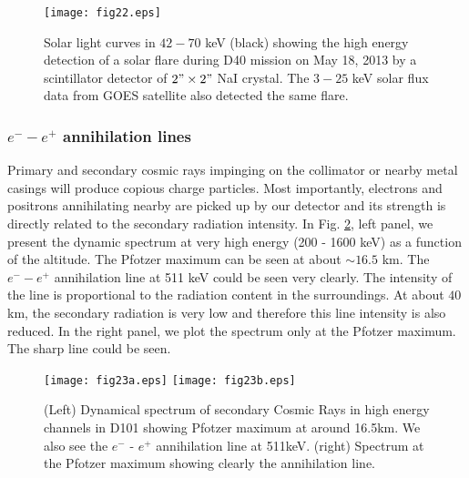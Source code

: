 \begin{figure}[h]
  \centering
  \texttt{[image: fig22.eps]}
\caption{Solar light curves in $42-70$ keV (black) showing the high energy detection 
of a solar flare during D40 mission on May 18, 2013 by a scintillator detector 
of $2" \times 2"$ NaI crystal. The $3-25$ keV solar flux data from GOES satellite 
also detected the same flare.} 
\label{fig:sollc}
\end{figure}

\subsubsection{$e^- - e^+$ annihilation lines}

Primary and secondary cosmic rays impinging on the collimator or nearby metal casings will produce 
copious charge particles. Most importantly, electrons and positrons annihilating nearby are picked 
up by our detector and its strength is directly related to the secondary 
radiation intensity. In Fig. \ref{fig:spec511pfot}, left panel, we present the dynamic spectrum at very high energy (200 - 1600 keV)
as  a function of the altitude. The Pfotzer maximum can be seen at about $\sim 16.5$ km.  The $e^- - e^+$
annihilation line at 511 keV could be seen very clearly. The intensity of the line is proportional to the 
radiation content in the surroundings. At about $40$ km, the secondary radiation is very low and therefore 
this line intensity is also reduced. In the right panel, we plot the spectrum only at the Pfotzer maximum. The sharp 
line could be seen. 

\begin{figure}[h]
  \centering
  \texttt{[image: fig23a.eps]}
  \texttt{[image: fig23b.eps]}
  \caption{ (Left) Dynamical spectrum of secondary Cosmic Rays 
in high energy channels in D101 showing Pfotzer maximum at around 16.5km.
We also see the $e^-$ - $e^+$ annihilation line at 511keV. (right) 
Spectrum at the Pfotzer maximum showing clearly the annihilation line.  }
   \label{fig:spec511pfot}
\end{figure}


